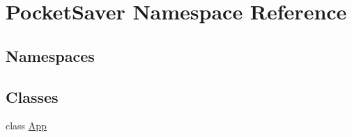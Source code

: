 \hypertarget{namespace_pocket_saver}{}\section{Pocket\+Saver Namespace Reference}
\label{namespace_pocket_saver}
\subsection*{Namespaces}
\begin{DoxyCompactItemize}
\end{DoxyCompactItemize}
\subsection*{Classes}
\begin{DoxyCompactItemize}
\item 
class \hyperlink{class_pocket_saver_1_1_app}{App}
\end{DoxyCompactItemize}
